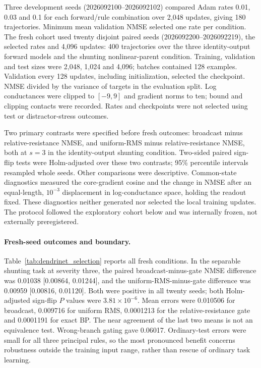 Three development seeds (2026092100--2026092102) compared Adam rates
0.01, 0.03 and 0.1 for each forward/rule combination over 2,048 updates,
giving 180 trajectories. Minimum mean validation NMSE selected one rate
per condition. The fresh cohort used twenty disjoint paired seeds
(2026092200--2026092219), the selected rates and 4,096 updates: 400
trajectories over the three identity-output forward models and the
shunting nonlinear-parent condition. Training, validation and test sizes
were 2,048, 1,024 and 4,096; batches contained 128 examples. Validation
every 128 updates, including initialization, selected the checkpoint.
NMSE divided by the variance of targets in the evaluation split.
Log conductances were clipped to $[-9,9]$ and gradient norms to ten;
bound and clipping contacts were recorded. Rates and checkpoints were
not selected using test or distractor-stress outcomes.

Two primary contrasts were specified before fresh outcomes: broadcast
minus relative-resistance NMSE, and uniform-RMS minus relative-resistance
NMSE, both at $s=3$ in the identity-output shunting condition. Two-sided
paired sign-flip tests were Holm-adjusted over these two contrasts;
95\% percentile intervals resampled whole seeds. Other comparisons were
descriptive. Common-state diagnostics measured the core-gradient cosine
and the change in NMSE after an equal-length, $10^{-3}$ displacement in
log-conductance space, holding the readout fixed. These diagnostics neither
generated nor selected the local training updates. The protocol followed
the exploratory cohort below and was internally frozen, not externally
preregistered.

\paragraph{Fresh-seed outcomes and boundary.}
Table~\ref{tab:dendrinet_selection} reports all fresh conditions. In the
separable shunting task at severity three, the paired broadcast-minus-gate
NMSE difference was 0.01038 [0.00864, 0.01244], and the uniform-RMS-minus-gate
difference was 0.00959 [0.00816, 0.01120]. Both were positive in all twenty
seeds; both Holm-adjusted sign-flip $P$ values were $3.81\times10^{-6}$.
Mean errors were 0.010506 for broadcast, 0.009716 for uniform RMS,
0.0001213 for the relative-resistance gate and 0.0001191 for exact BP.
The near agreement of the last two means is not an equivalence test.
Wrong-branch gating gave 0.06017. Ordinary-test errors were small for all
three principal rules, so the most pronounced benefit concerns robustness
outside the training input range, rather than rescue of ordinary task learning.

